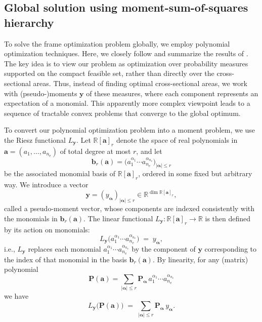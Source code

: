 \documentclass[preprint,3p]{elsarticle}
\numberwithin{equation}{section}
\begin{document}
\subsection{Global solution using moment-sum-of-squares hierarchy}\label{sec:moment}

To solve the frame optimization problem globally, we employ polynomial optimization techniques. Here, we closely follow and summarize the results of \citep{Tyburec2024global}. The key idea is to view our problem as optimization over probability measures supported on the compact feasible set, rather than directly over the cross-sectional areas. Thus, instead of finding optimal cross-sectional areas, we work with (pseudo-)moments $\mathbf{y}$ of these measures, where each component represents an expectation of a monomial. This apparently more complex viewpoint leads to a sequence of tractable convex problems that converge to the global optimum.

To convert our polynomial optimization problem into a moment problem, we use the Riesz functional $L_\mathbf{y}$. Let $\mathbb{R}[\mathbf{a}]_r$ denote the space of real polynomials in $\mathbf{a} = (a_1,\dots,a_{n_\mathrm{e}})$ of total degree at most $r$, and let
%
\begin{equation}
\mathbf{b}_r(\mathbf{a})
  =
  \big( a_1^{\alpha_1}\cdots a_{n_\mathrm{e}}^{\alpha_{n_\mathrm{e}}} \big)_{\lvert\bm{\alpha}\rvert \le r}
\end{equation}
%
be the associated monomial basis of $\mathbb{R}[\mathbf{a}]_r$, ordered in some fixed but arbitrary way. We introduce a vector
%
\begin{equation}
  \mathbf{y} = (y_{\bm{\alpha}})_{\lvert\bm{\alpha}\rvert \le r} \in \mathbb{R}^{\dim \mathbb{R}[\mathbf{a}]_r},
\end{equation}
%
called a pseudo-moment vector, whose components are indexed consistently with the monomials in $\mathbf{b}_r(\mathbf{a})$. The linear functional $L_{\mathbf{y}} : \mathbb{R}[\mathbf{a}]_r \to \mathbb{R}$ is then defined by its action on monomials:
%
\begin{equation}
  L_{\mathbf{y}}\big(a_1^{\alpha_1}\cdots a_{n_\mathrm{e}}^{\alpha_{n_\mathrm{e}}}\big)
  \;=\;
  y_{\bm{\alpha}},
\end{equation}
%
i.e., $L_{\mathbf{y}}$ replaces each monomial $a_1^{\alpha_1}\cdots a_{n_\mathrm{e}}^{\alpha_{n_\mathrm{e}}}$ by the component of $\mathbf{y}$ corresponding to the index of that monomial in the basis $\mathbf{b}_r(\mathbf{a})$. By linearity, for any (matrix) polynomial
%
\begin{equation}
  \mathbf{P}(\mathbf{a}) = \sum_{\lvert\bm{\alpha}\rvert \le r} \mathbf{P}_{\bm{\alpha}}\,
  a_1^{\alpha_1}\cdots a_{n_\mathrm{e}}^{\alpha_{n_\mathrm{e}}
}
\end{equation}
%
we have
%
\begin{equation}
  L_{\mathbf{y}}\big(\mathbf{P}(\mathbf{a})\big)
  \;=\;
  \sum_{\lvert\bm{\alpha}\rvert \le r} \mathbf{P}_{\bm{\alpha}}\, y_{\bm{\alpha}}.
\end{equation}
\end{document}
